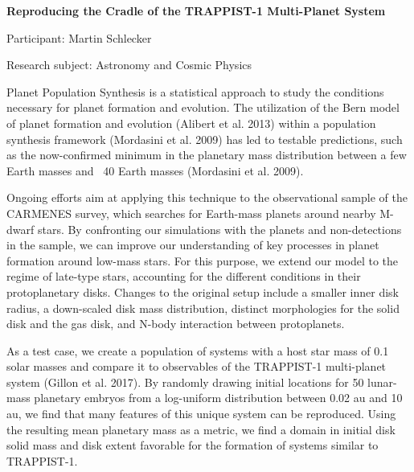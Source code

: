 \hfill 

\begin{minipage}[t]{1.0\textwidth}

\begin{center}

{{\large\bfseries Reproducing the Cradle of the TRAPPIST-1 Multi-Planet System}\par}

\end{center}

{\noindent Participant: Martin Schlecker\par} 

{\noindent Research subject: Astronomy and Cosmic Physics\par}\medskip

\noindent Planet Population Synthesis is a statistical approach to study the conditions necessary for planet formation and evolution. The utilization of the Bern model of planet formation and evolution (Alibert et al. 2013) within a population synthesis framework (Mordasini et al. 2009) has led to testable predictions, such as the now-confirmed minimum in the planetary mass distribution between a few Earth masses and ~40 Earth masses (Mordasini et al. 2009).

Ongoing efforts aim at applying this technique to the observational sample of the CARMENES survey, which searches for Earth-mass planets around nearby M-dwarf stars. By confronting our simulations with the planets and non-detections in the sample, we can improve our understanding of key processes in planet formation around low-mass stars. For this purpose, we extend our model to the regime of late-type stars, accounting for the different conditions in their protoplanetary disks. Changes to the original setup include a smaller inner disk radius, a down-scaled disk mass distribution, distinct morphologies for the solid disk and the gas disk, and N-body interaction between protoplanets.

As a test case, we create a population of systems with a host star mass of 0.1 solar masses and compare it to observables of the TRAPPIST-1 multi-planet system (Gillon et al. 2017). By randomly drawing initial locations for 50 lunar-mass planetary embryos from a log-uniform distribution between 0.02 au and 10 au, we find that many features of this unique system can be reproduced. Using the resulting mean planetary mass as a metric, we find a domain in initial disk solid mass and disk extent favorable for the formation of systems similar to TRAPPIST-1.\par\end{minipage}


